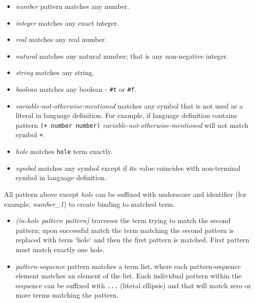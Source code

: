\begin{itemize}
\item
\textit{number} pattern matches any number.

\item
\textit{integer} matches any exact integer. 

\item
\textit{real} matches any real number.

\item
\textit{natural} matches any natural number; that is any non-negative integer.

\item
\textit{string} matches any string.

\item
\textit{boolean} matches any boolean - \texttt{\#t} or \texttt{\#f}.
\item
\textit{variable-not-otherwise-mentioned} matches any symbol that is not used as a literal in language definition. For example, if language definition contains pattern \texttt{(+ number number)} \textit{variable-not-otherwise-mentioned} will not match symbol \texttt{+}.

\item
\textit{hole} matches \texttt{hole} term exactly.

\item
\textit{symbol} matches any symbol except if its value coincides with non-terminal symbol in language definition.
\end{itemize}

All pattern above except \textit{hole} can be suffixed with underscore and identifier (for example, \textit{number\_1}) to create binding to matched term.

\begin{itemize}
\item
\textit{(in-hole pattern pattern)} traverses the term trying to match the second pattern; upon successful match the term matching the second pattern is replaced with term `hole` and then the first pattern is matched. First pattern must match exactly one hole.

\item
\textit{pattern-sequence} pattern matches a term list, where each pattern-sequence element matches an element of the list. Each individual pattern within the sequence can be suffixed with \texttt{...} (literal ellipsis) and that will match zero or more terms matching the pattern.
\end{itemize}

